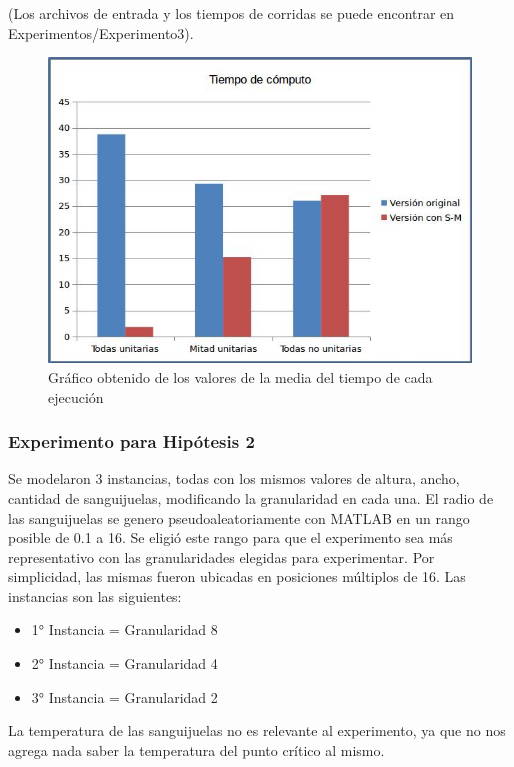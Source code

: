         
 (Los archivos de entrada y los tiempos de corridas se puede encontrar en Experimentos/Experimento3).


    \begin{figure}[H]
    \centering
    \includegraphics[scale=0.6]{graphs/graficoExp1.jpg}\caption{Gráfico obtenido de los valores de la media del tiempo de cada ejecución}
    \end{figure}
    
    
    
\subsubsection{Experimento para Hipótesis 2}
    Se modelaron 3 instancias, todas con los mismos valores de altura, ancho, cantidad de sanguijuelas, modificando la granularidad en cada una. El radio de las sanguijuelas se genero pseudoaleatoriamente con MATLAB en un rango posible de 0.1 a 16. Se eligió este rango para que el experimento sea más representativo con las granularidades elegidas para experimentar. Por simplicidad, las mismas fueron ubicadas en posiciones múltiplos de 16. Las instancias son las siguientes:
    
     \begin{itemize}
    \item 1° Instancia = Granularidad 8
    \item 2° Instancia = Granularidad 4
    \item 3° Instancia  = Granularidad 2
 \end{itemize}
 
  La temperatura de las sanguijuelas no es relevante al experimento, ya que no nos agrega nada saber la temperatura del punto crítico al mismo.
  
